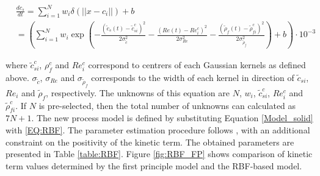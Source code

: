 \documentclass[../Article_Model_Parameters.tex]{subfiles}
\begin{document}
	{\footnotesize
		\begin{equation}
			\begin{split} \label{EQ:RBF}
				&\frac{dc_s}{dt} = \sum_{i=1}^{N} w_i \delta(||x-c_i||) + b \\
				&= \left( \sum_{i=1}^{N} w_i \exp \left( - \frac{ \left( \tilde{c}_s(t)-\tilde{c}_{si}^c \right)^2 }{2\sigma_{\tilde{c}}^2} - \frac{ \left( Re(t)-Re_i^c \right)^2 }{2\sigma_{Re}^2} - \frac{ \left( \tilde{\rho}_f(t) - \tilde{\rho}_{fi}^c \right)^2 }{2\sigma_{\tilde{\rho}_f}^2} \right) + b \right) \cdot 10^{-3}
			\end{split}
		\end{equation}
	}
	
	where $\tilde{c}_{si}^c$, $\rho_f^c$ and $Re_i^c$ correspond to centrers of each Gaussian kernels as defined above. $\sigma_{\tilde{c}}$, $\sigma_{Re}$ and $\sigma_{\tilde{\rho}_f}$ corresponds to the width of each kernel in direction of $\tilde{c}_{si}$, $Re_i$ and $\tilde{\rho}_f$, respectively. The unknowns of this equation are $N$, $w_i$, $\tilde{c}_{si}^c$, $Re_i^c$ and $\tilde{\rho}_{fi}^c$. If $N$ is pre-selected, then the total number of unknowns can calculated as $7N+1$. The new process model is defined by substituting Equation \ref{Model_solid} with \ref{EQ:RBF}. The parameter estimation procedure follows \citet{Sliczniuk2024}, with an additional constraint on the positivity of the kinetic term. The obtained parameters are presented in Table \ref{table:RBF}. Figure \ref{fig:RBF_FP} shows comparison of kinetic term values determined by the first principle model and the RBF-based model.
	
	\begin{table}[H]
		\centering
		\caption{Parameters of the RBF network}
		\label{table:RBF}
	\end{table}
	
\end{document}
